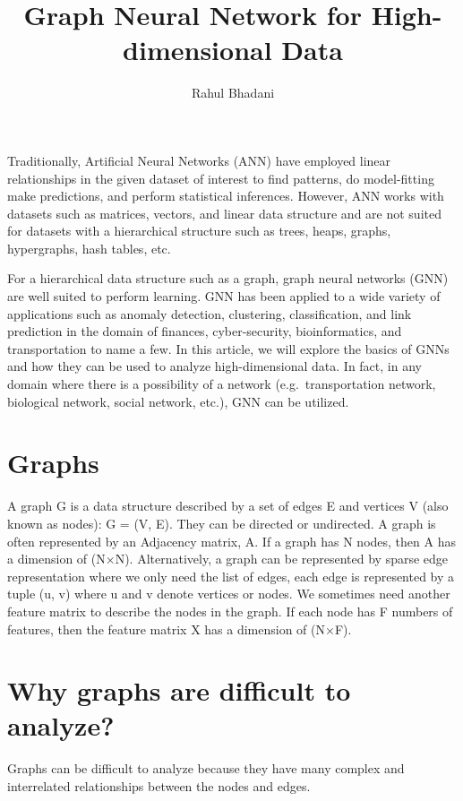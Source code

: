 \documentclass[
]{article}
\title{Graph Neural Network for High-dimensional Data}
\author{Rahul Bhadani}
\date{}
\begin{document}
\maketitle

Traditionally, Artificial Neural Networks (ANN) have employed linear
relationships in the given dataset of interest to find patterns, do
model-fitting make predictions, and perform statistical inferences.
However, ANN works with datasets such as matrices, vectors, and linear
data structure and are not suited for datasets with a hierarchical
structure such as trees, heaps, graphs, hypergraphs, hash tables, etc.

For a hierarchical data structure such as a graph, graph neural networks
(GNN) are well suited to perform learning. GNN has been applied to a
wide variety of applications such as anomaly detection, clustering,
classification, and link prediction in the domain of finances,
cyber-security, bioinformatics, and transportation to name a few. In
this article, we will explore the basics of GNNs and how they can be
used to analyze high-dimensional data. In fact, in any domain where
there is a possibility of a network (e.g.~transportation network,
biological network, social network, etc.), GNN can be utilized.

\hypertarget{graphs}{%
\section{Graphs}\label{graphs}}

A graph G is a data structure described by a set of edges E and vertices
V (also known as nodes): G = (V, E). They can be directed or undirected.
A graph is often represented by an Adjacency matrix, A. If a graph has N
nodes, then A has a dimension of (N×N). Alternatively, a graph can be
represented by sparse edge representation where we only need the list of
edges, each edge is represented by a tuple (u, v) where u and v denote
vertices or nodes. We sometimes need another feature matrix to describe
the nodes in the graph. If each node has F numbers of features, then the
feature matrix X has a dimension of (N×F).

\hypertarget{why-graphs-are-difficult-to-analyze}{%
\section{Why graphs are difficult to
analyze?}\label{why-graphs-are-difficult-to-analyze}}

Graphs can be difficult to analyze because they have many complex and
interrelated relationships between the nodes and edges.
\end{document}

